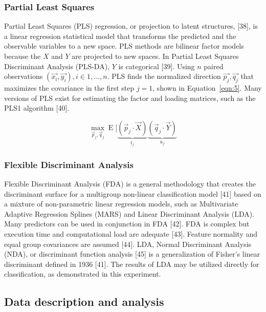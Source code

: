 \let\LaTeXcline\cline\documentclass[sn-mathphys-num]{sn-jnl}\let\cline\LaTeXcline
\begin{document}
\subsubsection{Partial Least Squares}

Partial Least Squares (PLS) regression, or projection to latent structures, [38], is a linear regression statistical model that transforms the predicted and the observable variables to a new space. PLS methods are bilinear factor models because the $X$ and $Y$ are projected to new spaces. In Partial Least Squares Discriminant Analysis (PLS-DA), $Y$ is categorical [39]. Using $n$ paired observations $\left(\vec{x_{i}}, \vec{y_{i}}\right), i \in 1, \dots, n$. PLS finds the normalized direction $\vec{p_{j}}, \vec{q_{j}}$ that maximizes the covariance in the first step $j = 1$, shown in Equation~\ref{eqn:5}. Many versions of PLS exist for estimating the factor and loading matrices, such as the PLS1 algorithm [40].

\begin{equation}
	\max_{{\vec{p}}_{j},{\vec{q}}_{j}}\operatorname{E} [\underbrace{({\vec{p}}_{j}\cdot {\vec{X}})}_{t_{j}}\underbrace{({\vec{q}}_{j}\cdot {\vec{Y}})}_{u_{j}}
	\label{eqn:5}
\end{equation}

\subsubsection{Flexible Discriminant Analysis}

Flexible Discriminant Analysis (FDA) is a general methodology that creates the discriminant surface for a multigroup non-linear classification model [41] based on a mixture of non-parametric linear regression models, such as Multivariate Adaptive Regression Splines (MARS) and Linear Discriminant Analysis (LDA). Many predictors can be used in conjunction in FDA [42]. FDA is complex but execution time and computational load are adequate [43]. Feature normality and equal group covariances are assumed [44]. LDA, Normal Discriminant Analysis (NDA), or discriminant function analysis [45] is a generalization of Fisher's linear discriminant defined in 1936 [41]. The results of LDA may be utilized directly for classification, as demonstrated in this experiment.

\subsection{Data description and analysis}
\end{document}

